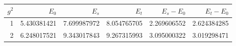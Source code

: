 \begin{tabular}{@{}rrrrrr@{}}\toprule
$g^2$ & $E_0$ & $E_s$ & $E_t$ & $E_s-E_0$ & $E_t-E_0$\\\midrule
1 & 5.430381421 & 7.699987972 & 8.054765705 & 2.269606552 & 2.624384285\\
2 & 6.248017521 & 9.343017843 & 9.267315993 & 3.095000322 & 3.019298471\\
\bottomrule\end{tabular}
